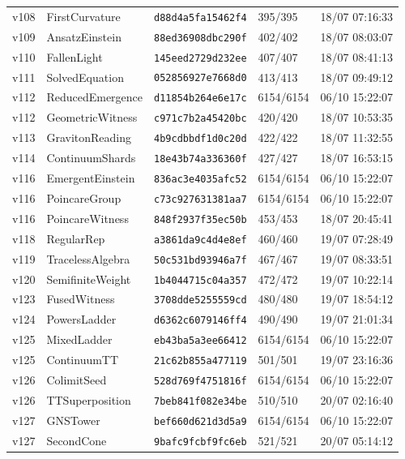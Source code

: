 \documentclass[11pt]{article}
\theoremstyle{definition}\newtheorem{deriv}{Derivation}
\begin{document}
{\begin{longtable}{@{}lllll@{}}
v108 & FirstCurvature & \texttt{d88d4a5fa15462f4} & 395/395 & 18/07 07:16:33 \\
v109 & AnsatzEinstein & \texttt{88ed36908dbc290f} & 402/402 & 18/07 08:03:07 \\
v110 & FallenLight & \texttt{145eed2729d232ee} & 407/407 & 18/07 08:41:13 \\
v111 & SolvedEquation & \texttt{052856927e7668d0} & 413/413 & 18/07 09:49:12 \\
v112 & ReducedEmergence & \texttt{d11854b264e6e17c} & 6154/6154 & 06/10 15:22:07 \\
v112 & GeometricWitness & \texttt{c971c7b2a45420bc} & 420/420 & 18/07 10:53:35 \\
v113 & GravitonReading & \texttt{4b9cdbbdf1d0c20d} & 422/422 & 18/07 11:32:55 \\
v114 & ContinuumShards & \texttt{18e43b74a336360f} & 427/427 & 18/07 16:53:15 \\
v116 & EmergentEinstein & \texttt{836ac3e4035afc52} & 6154/6154 & 06/10 15:22:07 \\
v116 & PoincareGroup & \texttt{c73c927631381aa7} & 6154/6154 & 06/10 15:22:07 \\
v116 & PoincareWitness & \texttt{848f2937f35ec50b} & 453/453 & 18/07 20:45:41 \\
v118 & RegularRep & \texttt{a3861da9c4d4e8ef} & 460/460 & 19/07 07:28:49 \\
v119 & TracelessAlgebra & \texttt{50c531bd93946a7f} & 467/467 & 19/07 08:33:51 \\
v120 & SemifiniteWeight & \texttt{1b4044715c04a357} & 472/472 & 19/07 10:22:14 \\
v123 & FusedWitness & \texttt{3708dde5255559cd} & 480/480 & 19/07 18:54:12 \\
v124 & PowersLadder & \texttt{d6362c6079146ff4} & 490/490 & 19/07 21:01:34 \\
v125 & MixedLadder & \texttt{eb43ba5a3ee66412} & 6154/6154 & 06/10 15:22:07 \\
v125 & ContinuumTT & \texttt{21c62b855a477119} & 501/501 & 19/07 23:16:36 \\
v126 & ColimitSeed & \texttt{528d769f4751816f} & 6154/6154 & 06/10 15:22:07 \\
v126 & TTSuperposition & \texttt{7beb841f082e34be} & 510/510 & 20/07 02:16:40 \\
v127 & GNSTower & \texttt{bef660d621d3d5a9} & 6154/6154 & 06/10 15:22:07 \\
v127 & SecondCone & \texttt{9bafc9fcbf9fc6eb} & 521/521 & 20/07 05:14:12 \\

\end{longtable}}
\end{document}
